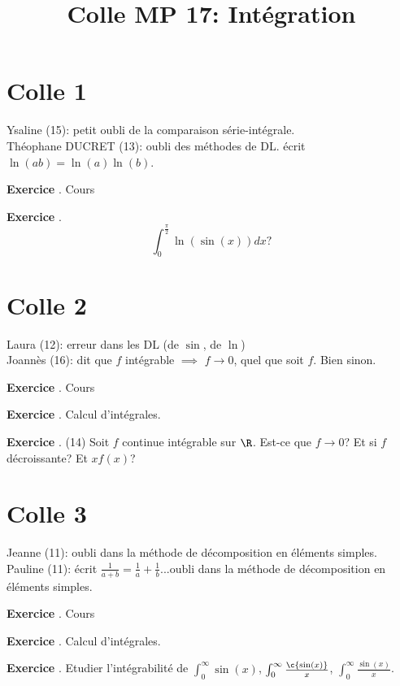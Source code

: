 \documentclass[10pt,a4paper]{article}
\title{Colle MP 17: Intégration}
\newcounter{question}
\newcounter{exo}
\newenvironment{exo}{\vspace{0.5cm}\setcounter{question}{0}\addtocounter{exo}{1} \noindent \textbf{Exercice \theexo}. \normalsize }{\par}
\begin{document}
	\maketitle
	
	\section*{Colle 1}
	Ysaline (15): petit oubli de la comparaison série-intégrale.\\
	Théophane DUCRET (13): oubli des méthodes de DL. écrit $\ln(ab) = \ln(a)\ln(b)$.\\
	
	\begin{exo}
		Cours
	\end{exo}	

	\begin{exo}
		$$\int_{0}^{\frac{\pi}{2}} \ln(\sin(x))dx?$$
	\end{exo}
	
	\section*{Colle 2}
	\setcounter{exo}{0}
	Laura (12): erreur dans les DL (de $\sin$, de $\ln$)\\
	Joannès (16): dit que $f$ intégrable $\implies$ $f \longrightarrow 0$, quel que soit $f$. Bien sinon.\\
	
	\begin{exo}
		Cours
	\end{exo}

	\begin{exo}
		Calcul d'intégrales.
	\end{exo}
	\begin{exo}
		(14) Soit $f$ continue intégrable sur $\R$. Est-ce que $f \longrightarrow 0$? Et si $f$ décroissante? Et $xf(x)$?
	\end{exo}

	\section*{Colle 3}
	\setcounter{exo}{0}
	Jeanne (11): oubli dans la méthode de décomposition en éléments simples. \\
	Pauline (11): écrit $\frac{1}{a+b} = \frac{1}{a} + \frac{1}{b}$...oubli dans la méthode de décomposition en éléments simples.\\
	
	\begin{exo}
		Cours
	\end{exo}

	\begin{exo}
		Calcul d'intégrales.
	\end{exo}
		
	\begin{exo}
		Etudier l'intégrabilité de $\int_{0}^{\infty} {\sin(x)}$, $\int_{0}^{\infty} \frac{\c{\sin(x)}}{x}$, $\int_{0}^{\infty} \frac{\sin(x)}{x}$.
	\end{exo}
\end{document}
